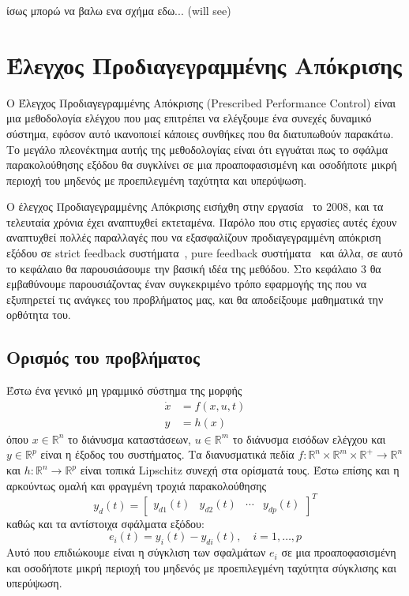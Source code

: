 ίσως μπορώ να βαλω ενα σχήμα εδω... (will see)

\section{Έλεγχος Προδιαγεγραμμένης Απόκρισης}
Ο Έλεγχος Προδιαγεγραμμένης Απόκρισης (Prescribed Performance Control) είναι μια μεθοδολογία ελέγχου που μας επιτρέπει να ελέγξουμε ένα συνεχές δυναμικό σύστημα, εφόσον αυτό ικανοποιεί κάποιες συνθήκες που θα διατυπωθούν παρακάτω. Το μεγάλο πλεονέκτημα αυτής της μεθοδολογίας είναι ότι εγγυάται πως το σφάλμα παρακολούθησης εξόδου θα συγκλίνει σε μια προαποφασισμένη και οσοδήποτε μικρή περιοχή του μηδενός με προεπιλεγμένη ταχύτητα και υπερύψωση.

Ο έλεγχος Προδιαγεγραμμένης Απόκρισης εισήχθη στην εργασία~\cite{bechlioulis2008robust} το 2008, και τα τελευταία χρόνια έχει αναπτυχθεί εκτεταμένα. Παρόλο που στις εργασίες αυτές έχουν αναπτυχθεί πολλές παραλλαγές που να εξασφαλίζουν προδιαγεγραμμένη απόκριση εξόδου σε strict feedback συστήματα~\cite{bechlioulis2009adaptive}, pure feedback συστήματα~\cite{bechlioulis2014low} και άλλα, σε αυτό το κεφάλαιο θα παρουσιάσουμε την βασική ιδέα της μεθόδου. Στο κεφάλαιο 3 θα εμβαθύνουμε παρουσιάζοντας έναν συγκεκριμένο τρόπο εφαρμογής της που να εξυπηρετεί τις ανάγκες του προβλήματος μας, και θα αποδείξουμε μαθηματικά την ορθότητα του.

\subsection{Ορισμός του προβλήματος}
Έστω ένα γενικό μη γραμμικό σύστημα της μορφής 
\begin{equation}
\begin{split}
\dot{x} &= f(x,u,t) \\
y &= h(x)
\end{split}
\label{eq:general_nonlinear_sys}
\end{equation}
όπου $x \in \mathbb{R}^n$ το διάνυσμα καταστάσεων, $ u\in \mathbb{R}^m$ το διάνυσμα εισόδων ελέγχου και $y \in \mathbb{R}^p$ είναι η έξοδος του συστήματος. Τα διανυσματικά πεδία $f: \mathbb{R}^n \times \mathbb{R}^m \times \mathbb{R}^+ \rightarrow \mathbb{R}^n$ και $h:\mathbb{R}^n \rightarrow \mathbb{R}^p$ είναι τοπικά Lipschitz συνεχή στα ορίσματά τους. Έστω επίσης και η αρκούντως ομαλή και φραγμένη τροχιά παρακολούθησης
\begin{equation*}
	y_d(t) = \begin{bmatrix}
		y_{d1}(t) & y_{d2}(t) & \cdots & y_{dp}(t)
	\end{bmatrix}^T
\end{equation*}
καθώς και τα αντίστοιχα σφάλματα εξόδου:
\begin{equation*}
	e_i(t) = y_i(t) - y_{di}(t), \quad i = 1,\dots ,p
\end{equation*}
Αυτό που επιδιώκουμε είναι η σύγκλιση των σφαλμάτων $e_i$ σε μια προαποφασισμένη και οσοδήποτε μικρή περιοχή του μηδενός με προεπιλεγμένη ταχύτητα σύγκλισης και υπερύψωση.

